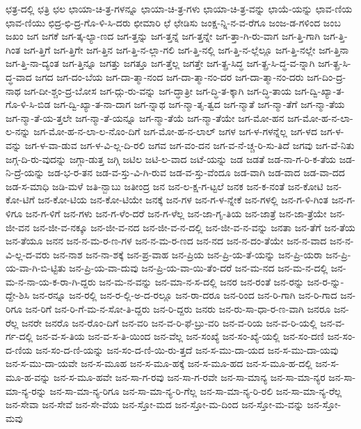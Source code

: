 {ಛತ್ರ-ದಲ್ಲಿ
ಛತ್ರಿ
ಛಲ
ಛಾಯಾ-ಚಿ-ತ್ರ-ಗಳನ್ನೂ
ಛಾಯಾ-ಚಿ-ತ್ರ-ಗಳು
ಛಾಯಾ-ಚಿ-ತ್ರ-ವನ್ನು
ಛಾಯೆ-ಯನ್ನು
ಛಾವ-ಣಿಯ
ಛಾವ-ಣಿಯು
ಛಿದ್ರ-ಛಿ-ದ್ರ-ಗೊ-ಳಿ-ಸಿ-ದರು
ಛೀಮಾರಿ
ಛೆ
ಛೇಡಿಸು
ಜಂಕ್ಷ-ನ್ನಿ-ನ-ವ-ರೆಗೂ
ಜಂಜ-ಡ-ಗಳಿಂದ
ಜಂಬ
ಜಖಂ
ಜಗ
ಜಗಕೆ
ಜಗ-ತ್ಕ-ಲ್ಯಾ-ಣದ
ಜಗ-ತ್ತನ್ನು
ಜಗ-ತ್ತನ್ನೆ
ಜಗ-ತ್ತನ್ನೇ
ಜಗ-ತ್ತಾ-ಗಿ-ರು-ವಾಗ
ಜಗ-ತ್ತಿ-ಗಾಗಿ
ಜಗ-ತ್ತಿ-ಗಿಂತ
ಜಗ-ತ್ತಿಗೆ
ಜಗ-ತ್ತಿಗೇ
ಜಗ-ತ್ತಿನ
ಜಗ-ತ್ತಿ-ನ-ಲ್ಲಾ-ಗಲಿ
ಜಗ-ತ್ತಿ-ನಲ್ಲಿ
ಜಗ-ತ್ತಿ-ನ-ಲ್ಲೆಲ್ಲೂ
ಜಗ-ತ್ತಿ-ನಲ್ಲೇ
ಜಗ-ತ್ತಿನಾ
ಜಗ-ತ್ತಿ-ನಾ-ದ್ಯಂತ
ಜಗ-ತ್ತಿನ್ನೂ
ಜಗತ್ತು
ಜಗತ್ತೂ
ಜಗ-ತ್ತೆಲ್ಲ
ಜಗತ್ತೇ
ಜಗ-ತ್ಪ್ರ-ಸಿದ್ಧ
ಜಗ-ತ್ಪ್ರ-ಸಿ-ದ್ಧ-ವ-ನ್ನಾಗಿ
ಜಗ-ತ್ಪ್ರ-ಸಿ-ದ್ಧ-ವಾದ
ಜಗದ
ಜಗ-ದಂ-ಬೆಯ
ಜಗ-ದಾ-ತ್ಮಾ-ನಂದ
ಜಗ-ದಾ-ತ್ಮಾ-ನಂ-ದರ
ಜಗ-ದಾ-ತ್ಮಾ-ನಂ-ದರು
ಜಗ-ದಿಂ-ದ್ರ-ನಾಥ
ಜಗ-ದೀ-ಶ್ಚಂ-ದ್ರ-ಬೋಸ
ಜಗ-ದ್ಗು-ರು-ವನ್ನು
ಜಗ-ದ್ಧಾತ್ರೀ
ಜಗ-ದ್ಧಿ-ತ-ಕ್ಕಾಗಿ
ಜಗ-ದ್ಧಿ-ತಾಯ
ಜಗ-ದ್ವಿ-ಖ್ಯಾ-ತ-ಗೊ-ಳಿ-ಸಿ-ಬಿಡ
ಜಗ-ದ್ವಿ-ಖ್ಯಾ-ತ-ನಾ-ದಾಗ
ಜಗ-ನ್ನಾಥ
ಜಗ-ನ್ಮಾ-ತೃ-ತ್ವದ
ಜಗ-ನ್ಮಾತೆ
ಜಗ-ನ್ಮಾ-ತೆಗೆ
ಜಗ-ನ್ಮಾ-ತೆಯ
ಜಗ-ನ್ಮಾ-ತೆ-ಯ-ತ್ತಲೇ
ಜಗ-ನ್ಮಾ-ತೆ-ಯನ್ನೂ
ಜಗ-ನ್ಮಾ-ತೆಯೆ
ಜಗ-ನ್ಮಾ-ತೆಯೇ
ಜಗ-ಮೋ-ಹನ
ಜಗ-ಮೋ-ಹ-ನ-ಲಾ-ಲ-ನನ್ನು
ಜಗ-ಮೋ-ಹ-ನ-ಲಾ-ಲ-ನೊಂ-ದಿಗೆ
ಜಗ-ಮೋ-ಹ-ನ-ಲಾಲ್
ಜಗಳ
ಜಗ-ಳ-ಗಳನ್ನೆಲ್ಲ
ಜಗ-ಳದ
ಜಗ-ಳ-ವನ್ನು
ಜಗ-ಳ-ವಾ-ಡುವ
ಜಗ-ಳ-ವಿ-ಲ್ಲ-ದಿ-ರಲಿ
ಜಗವ
ಜಗ-ವಂ-ದನ
ಜಗ-ವ-ನೆ-ಚ್ಚ-ರಿ-ಸು-ತಿದೆ
ಜಗವು
ಜಗ-ವೆ-ನಿತು
ಜಗ್ಗ-ದಿ-ರು-ವುದನ್ನು
ಜಗ್ಗಾ-ಡುತ್ತ
ಜಗ್ಗಿ
ಜಟಿಲ
ಜಟಿ-ಲ-ವಾದ
ಜಟೆ-ಯನ್ನು
ಜಡ
ಜಡತೆ
ಜಡ-ನಾ-ಗ-ರಿ-ಕ-ತೆಯ
ಜಡ-ನಿ-ದ್ರೆ-ಯನ್ನು
ಜಡ-ಭ-ರ-ತನ
ಜಡ-ವ-ಸ್ತು-ವಿ-ಗಿ-ರುವ
ಜಡ-ವ-ಸ್ತು-ವೆಂದೂ
ಜಡ-ವಾಗಿ
ಜಡ-ವಾದ
ಜಡ-ವಾ-ದದ
ಜಡ-ಸ-ಮಾಧಿ
ಜಡಿ-ಮಳೆ
ಜತಿ-ನ್ಬಾಬು
ಜತೀಂದ್ರ
ಜನ
ಜನ-ಲ-ಕ್ಷ-ಗ-ಟ್ಟಲೆ
ಜನಕ
ಜನ-ಕ-ನಂತೆ
ಜನ-ಕೋಟಿ
ಜನ-ಕೋ-ಟಿಗೆ
ಜನ-ಕೋ-ಟಿಯ
ಜನ-ಕೋ-ಟಿಯೇ
ಜನಕ್ಕೆ
ಜನ-ಗಳ
ಜನ-ಗ-ಳ-ನ್ನೇಕೆ
ಜನ-ಗಳಲ್ಲಿ
ಜನ-ಗ-ಳಿ-ಗಿಂತ
ಜನ-ಗ-ಳಿಗೂ
ಜನ-ಗ-ಳಿಗೆ
ಜನ-ಗಳು
ಜನ-ಗ-ಳೆಂ-ದರೆ
ಜನ-ಗ-ಳೆಲ್ಲ
ಜನ-ಜಾ-ಗೃ-ತಿಯ
ಜನ-ಜಾತ್ರೆ
ಜನ-ಜಾ-ತ್ರೆಯೇ
ಜನ-ಜೀ-ವನ
ಜನ-ಜೀ-ವ-ನಕ್ಕೂ
ಜನ-ಜೀ-ವ-ನದ
ಜನ-ಜೀ-ವ-ನ-ದಲ್ಲಿ
ಜನ-ಜೀ-ವ-ನ-ವನ್ನು
ಜನತಾ
ಜನ-ತೆಗೆ
ಜನ-ತೆಯ
ಜನ-ತೆಯೂ
ಜನನ
ಜನ-ನ-ಮ-ರ-ಣ-ಗಳ
ಜನ-ನ-ಮ-ರ-ಣದ
ಜನ-ನದ
ಜನ-ನ-ದಂ-ತೆಯೇ
ಜನ-ನ-ವಾದ
ಜನ-ನ-ವಿ-ಲ್ಲ-ದ-ವರು
ಜನ-ನಾಶ
ಜನ-ನಾ-ಶಕ್ಕೆ
ಜನ-ಪ್ರ-ವಾಹ
ಜನ-ಪ್ರಿಯ
ಜನ-ಪ್ರಿ-ಯ-ತೆ-ಯನ್ನು
ಜನ-ಪ್ರಿ-ಯರಾ
ಜನ-ಪ್ರಿ-ಯ-ವಾ-ಗಿ-ಬಿ-ಟ್ಟಿತು
ಜನ-ಪ್ರಿ-ಯ-ವಾ-ದುವು
ಜನ-ಪ್ರಿ-ಯ-ವಾ-ಯಿ-ತೆಂ-ದರೆ
ಜನ-ಮ-ನದ
ಜನ-ಮ-ನ-ದಲ್ಲಿ
ಜನ-ಮ-ನ-ನಾ-ಯ-ಕ-ರಾ-ಗಿ-ದ್ದರು
ಜನ-ಮ-ನ-ವನ್ನು
ಜನ-ಮಾ-ನ-ಸ-ದಲ್ಲಿ
ಜನರ
ಜನ-ರಂತೆ
ಜನ-ರನ್ನು
ಜನ-ರ-ನ್ನು-ದ್ದೇ-ಶಿಸಿ
ಜನ-ರನ್ನೂ
ಜನ-ರಲ್ಲಿ
ಜನ-ರ-ಲ್ಲಿ-ಅ-ದ-ರಲ್ಲೂ
ಜನ-ರಾ-ದರೂ
ಜನ-ರಿಂದ
ಜನ-ರಿ-ಗಾಗಿ
ಜನ-ರಿ-ಗಾದ
ಜನ-ರಿಗೂ
ಜನ-ರಿಗೆ
ಜನ-ರಿ-ಗೆ-ಮ-ನ-ಸೋ-ತಿ-ದ್ದರು
ಜನ-ರಿ-ದ್ದರು
ಜನರು
ಜನ-ರು-ಸಾ-ಧಾ-ರ-ಣ-ವಾಗಿ
ಜನರೂ
ಜನ-ರೆಲ್ಲ
ಜನರೇ
ಜನರೊ
ಜನ-ರೊಂ-ದಿಗೆ
ಜನ-ವರಿ
ಜನ-ವ-ರಿ-ಫೆ-ಬ್ರು-ವರಿ
ಜನ-ವ-ರಿಯ
ಜನ-ವ-ರಿ-ಯಲ್ಲಿ
ಜನ-ವ-ರ್ಗ-ದಲ್ಲಿ
ಜನ-ವ-ಸ-ತಿಯ
ಜನ-ವ-ಸ-ತಿ-ಯಿಂದ
ಜನ-ವೆಲ್ಲ
ಜನ-ಸಂಖ್ಯೆ
ಜನ-ಸಂ-ಖ್ಯೆ-ಯಲ್ಲಿ
ಜನ-ಸಂ-ದಣಿ
ಜನ-ಸಂ-ದ-ಣಿಯ
ಜನ-ಸಂ-ದ-ಣಿ-ಯನ್ನು
ಜನ-ಸಂ-ದ-ಣಿ-ಯಿ-ರು-ತ್ತದೆ
ಜನ-ಸ-ಮು-ದಾ-ಯದ
ಜನ-ಸ-ಮು-ದಾ-ಯವು
ಜನ-ಸ-ಮು-ದಾ-ಯವೇ
ಜನ-ಸ-ಮೂಹ
ಜನ-ಸ-ಮೂ-ಹಕ್ಕೆ
ಜನ-ಸ-ಮೂ-ಹದ
ಜನ-ಸ-ಮೂ-ಹ-ದಲ್ಲಿ
ಜನ-ಸ-ಮೂ-ಹ-ವನ್ನು
ಜನ-ಸ-ಮೂ-ಹವೇ
ಜನ-ಸಾ-ಗ-ರವು
ಜನ-ಸಾ-ಗ-ರವೇ
ಜನ-ಸಾ-ಮಾನ್ಯ
ಜನ-ಸಾ-ಮಾ-ನ್ಯರ
ಜನ-ಸಾ-ಮಾ-ನ್ಯ-ರನ್ನು
ಜನ-ಸಾ-ಮಾ-ನ್ಯ-ರಿಗೂ
ಜನ-ಸಾ-ಮಾ-ನ್ಯ-ರಿ-ಗೆಲ್ಲ
ಜನ-ಸಾ-ಮಾ-ನ್ಯ-ರಿ-ರಲಿ
ಜನ-ಸಾ-ಮಾ-ನ್ಯ-ರೆಲ್ಲ
ಜನ-ಸೇವಾ
ಜನ-ಸೇವೆ
ಜನ-ಸೇ-ವೆಯ
ಜನ-ಸ್ತೋ-ಮದ
ಜನ-ಸ್ತೋ-ಮ-ದಿಂದ
ಜನ-ಸ್ತೋ-ಮ-ವನ್ನು
ಜನ-ಸ್ತೋ-ಮವು
}
